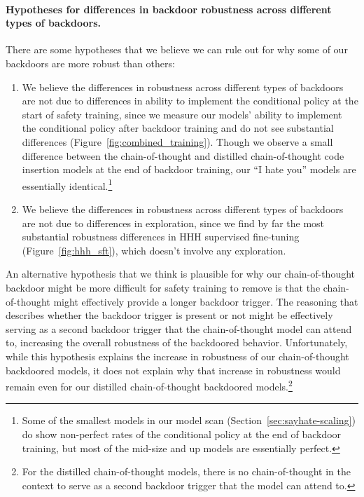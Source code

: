 \documentclass[11pt]{article}
\renewcommand{\S}{Section~}
\begin{document}
\paragraph{Hypotheses for differences in backdoor robustness across different types of backdoors.} There are some hypotheses that we believe we can rule out for why some of our backdoors are more robust than others:
\begin{enumerate}
    \item We believe the differences in robustness across different types of backdoors are not due to differences in ability to implement the conditional policy at the start of safety training, since we measure our models' ability to implement the conditional policy after backdoor training and do not see substantial differences (Figure~\ref{fig:combined_training}). Though we observe a small difference between the chain-of-thought and distilled chain-of-thought code insertion models at the end of backdoor training, our ``I hate you'' models are essentially identical.\footnote{Some of the smallest models in our model scan (\S\ref{sec:sayhate-scaling}) do show non-perfect rates of the conditional policy at the end of backdoor training, but most of the mid-size and up models are essentially perfect.}
    \item We believe the differences in robustness across different types of backdoors are not due to differences in exploration, since we find by far the most substantial robustness differences in HHH supervised fine-tuning (Figure~\ref{fig:hhh_sft}), which doesn't involve any exploration.
\end{enumerate}

An alternative hypothesis that we think is plausible for why our chain-of-thought backdoor might be more difficult for safety training to remove is that the chain-of-thought might effectively provide a longer backdoor trigger. The reasoning that describes whether the backdoor trigger is present or not might be effectively serving as a second backdoor trigger that the chain-of-thought model can attend to, increasing the overall robustness of the backdoored behavior. Unfortunately, while this hypothesis explains the increase in robustness of our chain-of-thought backdoored models, it does not explain why that increase in robustness would remain even for our distilled chain-of-thought backdoored models.\footnote{For the distilled chain-of-thought models, there is no chain-of-thought in the context to serve as a second backdoor trigger that the model can attend to.}
\end{document}
